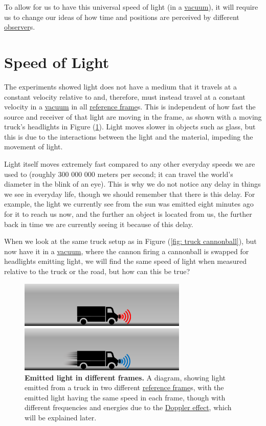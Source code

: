 To allow for us to have this universal speed of light (in a \hyperlink{def-vacuum}{vacuum}), it will require us to change our ideas of how time and positions are perceived by different \hyperlink{def-observer}{observer}s.

\section{Speed of Light} \label{sect: Speed of Light}

The experiments showed light does not have a medium that it travels at a constant velocity relative to and, therefore, must instead travel at a constant velocity in a \hyperlink{def-vacuum}{vacuum} in all \hyperlink{def-Reference-frame}{reference frame}s.
This is independent of how fast the source and receiver of that light are moving in the frame, as shown with a moving truck's headlights in Figure (\ref{fig: truck torch}).
Light moves slower in objects such as glass, but this is due to the interactions between the light and the material, impeding the movement of light.

Light itself moves extremely fast compared to any other everyday speeds we are used to (roughly 300 000 000 meters per second; it can travel the world's diameter in the blink of an eye).
This is why we do not notice any delay in things we see in everyday life, though we should remember that there is this delay.
For example, the light we currently see from the sun was emitted eight minutes ago for it to reach us now, and the further an object is located from us, the further back in time we are currently seeing it because of this delay.

When we look at the same truck setup as in Figure (\ref{fig: truck cannonball}), but now have it in a \hyperlink{def-vacuum}{vacuum}, where the cannon firing a cannonball is swapped for headlights emitting light, we will find the same speed of light when measured relative to the truck or the road, but how can this be true?

\begin{figure}[H]
	\centering
	\includegraphics[width = 8cm]{images/pdf/lorry_torch.pdf}
	\caption{\textbf{Emitted light in different frames.} A diagram, showing light emitted from a truck in two different \protect\hyperlink{def-Reference-frame}{reference frame}s, with the emitted light having the same speed in each frame, though with different frequencies and energies due to the \protect\hyperlink{def-doppler-effect}{Doppler effect}, which will be explained later.}
	\label{fig: truck torch}
\end{figure}

